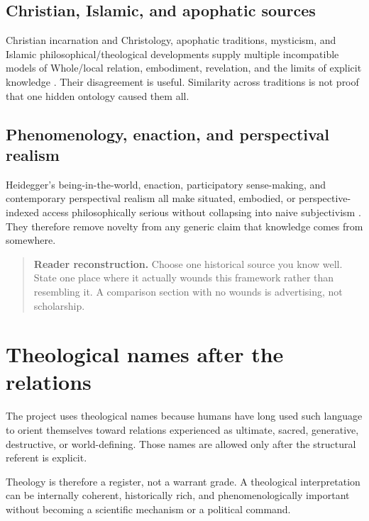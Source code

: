 \documentclass[11pt]{article}
\newenvironment{readercheck}{\begin{quote}\small\noindent\textbf{Reader reconstruction.}\;}{\end{quote}}
\begin{document}
\subsection{Christian, Islamic, and apophatic sources}

Christian incarnation and Christology, apophatic traditions, mysticism, and Islamic philosophical/theological developments supply multiple incompatible models of Whole/local relation, embodiment, revelation, and the limits of explicit knowledge \cite{SEPChristianTheology2022,SEPPseudoDionysius2019,SEPMysticism2025,SEPArabicIslamicNatural2022,SEPIbnSinaNatural2025,SEPPhenomenologyReligion2024}. Their disagreement is useful. Similarity across traditions is not proof that one hidden ontology caused them all.

\subsection{Phenomenology, enaction, and perspectival realism}

Heidegger's being-in-the-world, enaction, participatory sense-making, and contemporary perspectival realism all make situated, embodied, or perspective-indexed access philosophically serious without collapsing into naive subjectivism \cite{Heidegger2026BeingTime,SEPHeidegger2025,DeJaegherDiPaolo2007Participatory,Massimi2022Perspectival}. They therefore remove novelty from any generic claim that knowledge comes from somewhere.

\begin{readercheck}
Choose one historical source you know well. State one place where it actually wounds this framework rather than resembling it. A comparison section with no wounds is advertising, not scholarship.
\end{readercheck}

\section{Theological names after the relations}

The project uses theological names because humans have long used such language to orient themselves toward relations experienced as ultimate, sacred, generative, destructive, or world-defining. Those names are allowed only after the structural referent is explicit.

Theology is therefore a register, not a warrant grade. A theological interpretation can be internally coherent, historically rich, and phenomenologically important without becoming a scientific mechanism or a political command.
\end{document}
